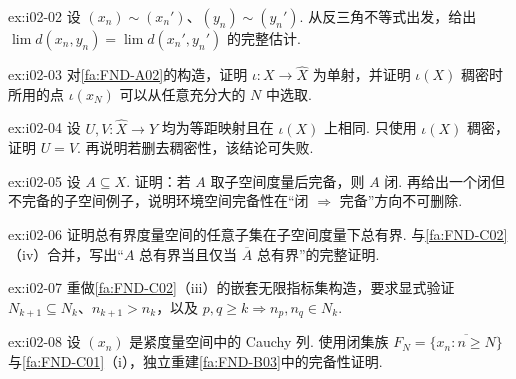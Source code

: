 \begin{FAExercise}[完备化距离的代表元独立性]{ex:i02-02}
设 \(\displaystyle (x_n)\sim(x_n')\)、\(\displaystyle (y_n)\sim(y_n')\). 从反三角不等式出发，给出 \(\displaystyle \lim d(x_n,y_n)=\lim d(x_n',y_n')\) 的完整估计.
\end{FAExercise}

\begin{FAExercise}[常值列嵌入]{ex:i02-03}
对\autoref{fa:FND-A02}的构造，证明 \(\displaystyle \iota:X\to\widehat X\) 为单射，并证明 \(\displaystyle \iota(X)\) 稠密时所用的点 \(\displaystyle \iota(x_N)\) 可以从任意充分大的 \(\displaystyle N\) 中选取.
\end{FAExercise}

\begin{FAExercise}[完备化的满等距唯一性]{ex:i02-04}
设 \(\displaystyle U,V:\widehat X\to Y\) 均为等距映射且在 \(\displaystyle \iota(X)\) 上相同. 只使用 \(\displaystyle \iota(X)\) 稠密，证明 \(\displaystyle U=V\). 再说明若删去稠密性，该结论可失败.
\end{FAExercise}

\begin{FAExercise}[完备子空间与闭性]{ex:i02-05}
设 \(\displaystyle A\subseteq X\). 证明：若 \(\displaystyle A\) 取子空间度量后完备，则 \(\displaystyle A\) 闭. 再给出一个闭但不完备的子空间例子，说明环境空间完备性在“闭 \(\displaystyle \Rightarrow\) 完备”方向不可删除.
\end{FAExercise}

\begin{FAExercise}[总有界性的遗传性]{ex:i02-06}
证明总有界度量空间的任意子集在子空间度量下总有界. 与\autoref{fa:FND-C02}（iv）合并，写出“\(\displaystyle A\) 总有界当且仅当 \(\displaystyle \overline A\) 总有界”的完整证明.
\end{FAExercise}

\begin{FAExercise}{ex:i02-07}
重做\autoref{fa:FND-C02}（iii）的嵌套无限指标集构造，要求显式验证 \(\displaystyle N_{k+1}\subseteq N_k\)、\(\displaystyle n_{k+1}>n_k\)，以及 \(\displaystyle p,q\geqslant k\Rightarrow n_p,n_q\in N_k\).
\end{FAExercise}

\begin{FAExercise}[紧性推出完备性的尾闭包证明]{ex:i02-08}
设 \(\displaystyle (x_n)\) 是紧度量空间中的 Cauchy 列. 使用闭集族 \(\displaystyle F_N=\overline{\{x_n:n\geqslant N\}}\) 与\autoref{fa:FND-C01}（i），独立重建\autoref{fa:FND-B03}中的完备性证明.
\end{FAExercise}

